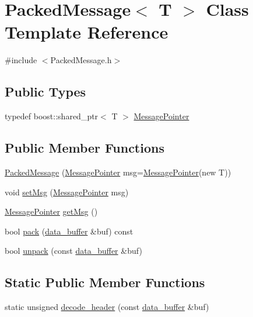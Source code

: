 \hypertarget{class_packed_message}{}\section{Packed\+Message$<$ T $>$ Class Template Reference}
\label{class_packed_message}


{\ttfamily \#include $<$Packed\+Message.\+h$>$}

\subsection*{Public Types}
\begin{DoxyCompactItemize}
\item 
typedef boost\+::shared\+\_\+ptr$<$ T $>$ \hyperlink{class_packed_message_abd3314a806bd82d0b6fc076034e3d7f6}{Message\+Pointer}
\end{DoxyCompactItemize}
\subsection*{Public Member Functions}
\begin{DoxyCompactItemize}
\item 
\hyperlink{class_packed_message_a54361c18b3c4d092b491ebddd4cd3514}{Packed\+Message} (\hyperlink{class_packed_message_abd3314a806bd82d0b6fc076034e3d7f6}{Message\+Pointer} msg=\hyperlink{class_packed_message_abd3314a806bd82d0b6fc076034e3d7f6}{Message\+Pointer}(new T))
\item 
void \hyperlink{class_packed_message_a109d884ee70ef7fd6e7c7288dd4cd003}{set\+Msg} (\hyperlink{class_packed_message_abd3314a806bd82d0b6fc076034e3d7f6}{Message\+Pointer} msg)
\item 
\hyperlink{class_packed_message_abd3314a806bd82d0b6fc076034e3d7f6}{Message\+Pointer} \hyperlink{class_packed_message_a5892ce717ad163486796a6648718b284}{get\+Msg} ()
\item 
bool \hyperlink{class_packed_message_a87f97f2ced02c3b9044dea707a5d3aac}{pack} (\hyperlink{_packed_message_8h_a9c53615665c5a1ed76b034e6e4f97942}{data\+\_\+buffer} \&buf) const 
\item 
bool \hyperlink{class_packed_message_a0822d18835d6340a74d7a9edbd53a6f1}{unpack} (const \hyperlink{_packed_message_8h_a9c53615665c5a1ed76b034e6e4f97942}{data\+\_\+buffer} \&buf)
\end{DoxyCompactItemize}
\subsection*{Static Public Member Functions}
\begin{DoxyCompactItemize}
\item 
static unsigned \hyperlink{class_packed_message_abb912f0c1590bab05b8dd20b74dc9116}{decode\+\_\+header} (const \hyperlink{_packed_message_8h_a9c53615665c5a1ed76b034e6e4f97942}{data\+\_\+buffer} \&buf)
\end{DoxyCompactItemize}
